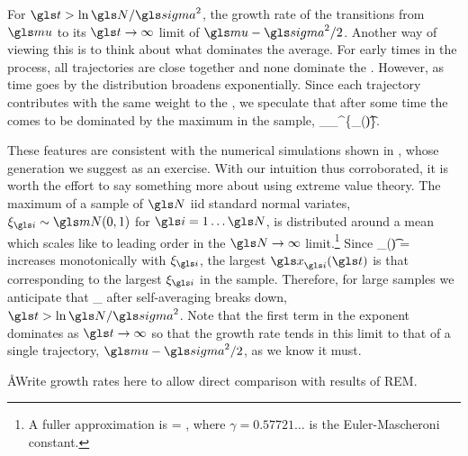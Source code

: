 For $\t>\ln \N/\gsigma^2$, the growth rate of the \PEA transitions from $\gmu$ to its $\t\to\infty$ limit of $\gmu-\gsigma^2/2$. 
Another way of viewing this is to think about what dominates the average. For early times in the process, all trajectories are close together and none dominate the \PEA. However, as time goes by the distribution broadens exponentially. Since each trajectory contributes with the same weight to the \PEA, we speculate that after some time the \PEA comes to be dominated by the maximum in the sample,
\be
\ave{\x(\t)}_\N \approx {}\max_{}^\N \{\x_\gi(\t)\}.
\ee

These features are consistent with the numerical simulations shown in , whose generation we suggest as an exercise. With our intuition thus corroborated, it is worth the effort to say something more about  using extreme value theory. The maximum of a sample of $\N$ iid standard normal variates, $\xi_\gi\sim\mN(0,1)$ for $\gi=1\dots\N$, is distributed around a mean which scales like
\be
{} \approx \sqrt{2\ln\N}
\ee
to leading order in the $\N\to\infty$ limit.\footnote{A fuller approximation is
\be
{} = ,
\ee
where $\gamma=0.57721\dots$ is the Euler-Mascheroni constant.} Since
\be
\x_\gi(\t) = \exp{}
\ee
increases monotonically with $\xi_\gi$, the largest $\x_\gi(\t)$ is that corresponding to the largest $\xi_\gi$ in the sample. Therefore, for large samples we anticipate that
\be
\ave{\x(\t)}_\N \approx {} \exp{}
\ee
after self-averaging breaks down, $\t>\ln\N/\gsigma^2$. Note that the first term in the exponent dominates as $\t\to\infty$ so that the growth rate tends in this limit to that of a single trajectory, $\gmu-\gsigma^2/2$, as we know it must.

\AA{Write growth rates here to allow direct comparison with results of REM.}

